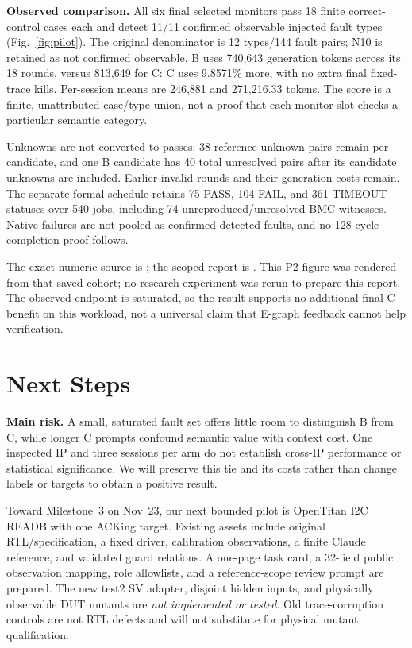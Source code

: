 \documentclass[conference,10pt,letterpaper]{IEEEtran}
\begin{document}
\textbf{Observed comparison.} All six final selected monitors pass 18 finite
correct-control cases each and detect 11/11 confirmed observable injected fault
types (Fig.~\ref{fig:pilot}). The original denominator is 12 types/144 fault pairs;
N10 is retained as not confirmed observable. B uses 740,643 generation tokens
across its 18 rounds, versus 813,649 for C: C uses 9.8571\% more, with no extra final
fixed-trace kills. Per-session means are 246,881 and 271,216.33 tokens. The score
is a finite, unattributed case/type union, not a proof that each monitor slot
checks a particular semantic category.

Unknowns are not converted to passes: 38 reference-unknown pairs remain per
candidate, and one B candidate has 40 total unresolved pairs after its candidate
unknowns are included. Earlier invalid rounds and their generation costs remain.
The separate formal schedule retains 75 PASS, 104 FAIL, and 361 TIMEOUT statuses over 540
jobs, including 74 unreproduced/unresolved BMC witnesses. Native failures are not
pooled as confirmed detected faults, and no 128-cycle completion proof follows.

The exact numeric source is
; the scoped
report is .
This P2 figure was rendered from that saved cohort; no research experiment was
rerun to prepare this report. The observed endpoint is saturated, so the result
supports no additional final C benefit on this workload, not a universal claim
that E-graph feedback cannot help verification.

\section{Next Steps}
\textbf{Main risk.} A small, saturated fault set offers little room to distinguish
B from C, while longer C prompts confound semantic value with context cost.
One inspected IP and three sessions per arm do not establish cross-IP
performance or statistical significance. We will preserve this tie and its
costs rather than change labels or targets to obtain a positive result.

Toward Milestone~3 on Nov~23, our next bounded pilot is OpenTitan I2C READB with
one ACKing target. Existing assets include original RTL/specification, a fixed
driver, calibration observations, a finite Claude reference, and validated guard
relations. A one-page task card, a 32-field public observation mapping, role
allowlists, and a reference-scope review prompt are prepared. The new test2 SV
adapter, disjoint hidden inputs, and physically observable DUT mutants are
\emph{not implemented or tested}. Old trace-corruption controls are not RTL
defects and will not substitute for physical mutant qualification.
\end{document}
